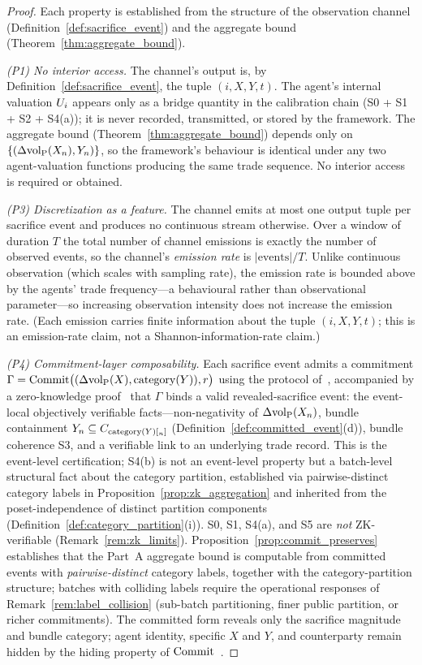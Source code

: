 \begin{proof}
Each property is established from the structure of the observation
channel (Definition~\ref{def:sacrifice_event}) and the aggregate
bound (Theorem~\ref{thm:aggregate_bound}).

\emph{(P1) No interior access.}
The channel's output is, by Definition~\ref{def:sacrifice_event},
the tuple $(i, X, Y, t)$.  The agent's internal valuation $U_i$
appears only as a bridge quantity in the calibration chain
(S0 + S1 + S2 + S4(a)); it is never recorded, transmitted, or
stored by the framework.  The aggregate bound
(Theorem~\ref{thm:aggregate_bound}) depends only on
$\{(\Delta{\operatorname{vol}_{\mathrm{P}}}(X_n), Y_n)\}$, so the framework's behaviour is
identical under any two agent-valuation functions producing the
same trade sequence.  No interior access is required or obtained.

\emph{(P3) Discretization as a feature.}
The channel emits at most one output tuple per sacrifice event
and produces no continuous stream otherwise.  Over a window of
duration $T$ the total number of channel emissions is exactly
the number of observed events, so the channel's \emph{emission
rate} is $|\mathrm{events}|/T$.  Unlike continuous observation
(which scales with sampling rate), the emission rate is bounded
above by the agents' trade frequency---a behavioural rather than
observational parameter---so increasing observation intensity
does not increase the emission rate.  (Each emission carries
finite information about the tuple $(i, X, Y, t)$; this is an
emission-rate claim, not a Shannon-information-rate claim.)

\emph{(P4) Commitment-layer composability.}
Each sacrifice event admits a commitment
$\Gamma = \mathrm{Commit}\bigl((\Delta{\operatorname{vol}_{\mathrm{P}}}(X), \mathrm{category}(Y)), r\bigr)$
using the protocol of~\citep[Definition~6]{lasser2026exo},
accompanied by a zero-knowledge
proof~\citep[Definition~7]{lasser2026exo} that $\Gamma$ binds a
valid revealed-sacrifice event: the event-local objectively
verifiable facts---non-negativity of $\Delta{\operatorname{vol}_{\mathrm{P}}}(X_n)$, bundle
containment $Y_n \subseteq C_{\mathrm{category}(Y)[_n]}$
(Definition~\ref{def:committed_event}(d)), bundle coherence S3,
and a verifiable link to an underlying trade record.  This is
the event-level certification; S4(b) is not an event-level
property but a batch-level structural fact about the category
partition, established via pairwise-distinct category labels in
Proposition~\ref{prop:zk_aggregation} and inherited from the
poset-independence of distinct partition components
(Definition~\ref{def:category_partition}(i)).  S0, S1, S4(a),
and S5 are \emph{not} ZK-verifiable
(Remark~\ref{rem:zk_limits}).
Proposition~\ref{prop:commit_preserves} establishes that the
Part~A aggregate bound is computable from committed events with
\emph{pairwise-distinct} category labels, together with the
category-partition structure; batches with colliding labels
require the operational responses of
Remark~\ref{rem:label_collision} (sub-batch partitioning, finer
public partition, or richer commitments).  The committed form
reveals only the sacrifice magnitude and bundle category; agent
identity, specific $X$ and $Y$, and counterparty remain hidden
by the hiding property of
$\mathrm{Commit}$~\citep{goldwasser1985knowledge}.
\end{proof}

